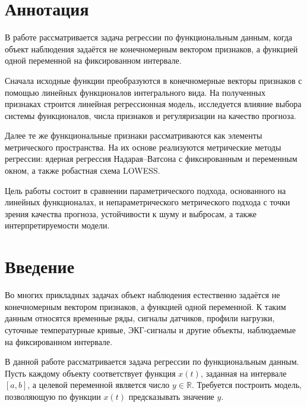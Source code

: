 \documentclass[14pt,a4paper]{extarticle}
\begin{document}
\tableofcontents
\newpage


\section*{Аннотация}

В работе рассматривается задача регрессии по функциональным данным, когда объект наблюдения задаётся не конечномерным вектором признаков, а функцией одной переменной на фиксированном интервале.

Сначала исходные функции преобразуются в конечномерные векторы признаков с помощью линейных функционалов интегрального вида. На полученных признаках строится линейная регрессионная модель, исследуется влияние выбора системы функционалов, числа признаков и регуляризации на качество прогноза.

Далее те же функциональные признаки рассматриваются как элементы метрического пространства. На их основе реализуются метрические методы регрессии: ядерная регрессия Надарая--Ватсона с фиксированным и переменным окном, а также робастная схема LOWESS.

Цель работы состоит в сравнении параметрического подхода, основанного на линейных функционалах, и непараметрического метрического подхода с точки зрения качества прогноза, устойчивости к шуму и выбросам, а также интерпретируемости модели.

\newpage


\section*{Введение}

Во многих прикладных задачах объект наблюдения естественно задаётся не конечномерным вектором признаков, а функцией одной переменной. К таким данным относятся временные ряды, сигналы датчиков, профили нагрузки, суточные температурные кривые, ЭКГ-сигналы и другие объекты, наблюдаемые на фиксированном интервале.

В данной работе рассматривается задача регрессии по функциональным данным. Пусть каждому объекту соответствует функция \(x(t)\), заданная на интервале \([a,b]\), а целевой переменной является число \(y \in \mathbb{R}\). Требуется построить модель, позволяющую по функции \(x(t)\) предсказывать значение \(y\).
\end{document}
